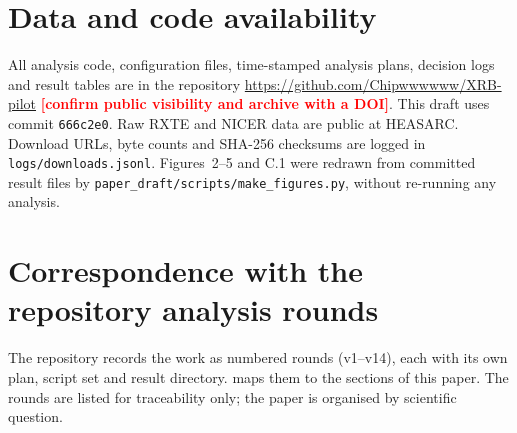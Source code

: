 \documentclass[11pt,a4paper]{article}
\newcommand{\placeholder}[1]{\textcolor{red}{\textbf{[#1]}}}
\begin{document}
\section*{Data and code availability}
All analysis code, configuration files, time-stamped analysis plans, decision logs and result tables are in the
repository \url{https://github.com/Chipwwwwww/XRB-pilot} \placeholder{confirm public visibility and archive with a DOI}.
This draft uses commit \texttt{666c2e0}. Raw RXTE and NICER data are public at HEASARC. Download URLs, byte counts and
SHA-256 checksums are logged in \texttt{logs/downloads.jsonl}. Figures~2--5 and C.1 were redrawn from committed result
files by \texttt{paper\_draft/scripts/make\_figures.py}, without re-running any analysis.




\appendix
{}
\section{Correspondence with the repository analysis rounds}\label{app:versions}
The repository records the work as numbered rounds (v1--v14), each with its own plan, script set and result directory.
 maps them to the sections of this paper. The rounds are listed for traceability only; the paper is
organised by scientific question.
\end{document}
